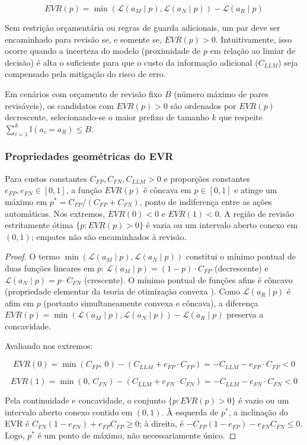 \begin{definition}
\[
EVR(p) = \min(\mathcal{L}(a_M\mid p), \mathcal{L}(a_N\mid p)) - \mathcal{L}(a_R\mid p)
\]
\end{definition}

Sem restrição orçamentária ou regras de guarda adicionais, um par deve ser encaminhado para revisão se, e somente se, $EVR(p) > 0$. Intuitivamente, isso ocorre quando a incerteza do modelo (proximidade de $p$ em relação ao limiar de decisão) é alta o suficiente para que o custo da informação adicional ($C_{LLM}$) seja compensado pela mitigação do risco de erro.

Em cenários com orçamento de revisão fixo $B$ (número máximo de pares revisáveis), os candidatos com $EVR(p)>0$ são ordenados por $EVR(p)$ decrescente, selecionando-se o maior prefixo de tamanho $k$ que respeite $\sum_{i=1}^k \mathbb{I}(a_i=a_R) \le B$.

\subsubsection{Propriedades geométricas do EVR}

\begin{proposition}[Concavidade]
\label{prop:evr-concavity}
Para custos constantes $C_{FP},C_{FN},C_{LLM}>0$ e proporções constantes $e_{FP},e_{FN}\in[0,1]$, a função $EVR(p)$ é côncava em $p\in[0,1]$ e atinge um máximo em $p^* = C_{FP}/(C_{FP} + C_{FN})$, ponto de indiferença entre as ações automáticas. Nos extremos, $EVR(0)<0$ e $EVR(1)<0$. A região de revisão estritamente ótima $\{p:EVR(p)>0\}$ é vazia ou um intervalo aberto conexo em $(0,1)$; empates não são encaminhados à revisão.
\end{proposition}

\begin{proof}
O termo $\min(\mathcal{L}(a_M\mid p), \mathcal{L}(a_N\mid p))$ constitui o mínimo pontual de duas funções lineares em $p$: $\mathcal{L}(a_M\mid p) = (1-p) \cdot C_{FP}$ (decrescente) e $\mathcal{L}(a_N\mid p) = p \cdot C_{FN}$ (crescente). O mínimo pontual de funções afins é côncavo (propriedade elementar da teoria de otimização convexa \cite{Boyd2004convex}). Como $\mathcal{L}(a_R\mid p)$ é afim em $p$ (portanto simultaneamente convexa e côncava), a diferença $EVR(p) = \min(\mathcal{L}(a_M\mid p), \mathcal{L}(a_N\mid p)) - \mathcal{L}(a_R\mid p)$ preserva a concavidade.

Avaliando nos extremos:

\[
EVR(0) = \min(C_{FP},\, 0) - (C_{LLM} + e_{FP} \cdot C_{FP}) = -C_{LLM} - e_{FP} \cdot C_{FP} < 0
\]

\[
EVR(1) = \min(0,\, C_{FN}) - (C_{LLM} + e_{FN} \cdot C_{FN}) = -C_{LLM} - e_{FN} \cdot C_{FN} < 0
\]

Pela continuidade e concavidade, o conjunto $\{p:EVR(p)>0\}$ é vazio ou um intervalo aberto conexo contido em $(0,1)$. À esquerda de $p^*$, a inclinação do EVR é $C_{FN}(1-e_{FN})+e_{FP}C_{FP}\ge0$; à direita, é $-C_{FP}(1-e_{FP})-e_{FN}C_{FN}\le0$. Logo, $p^*$ é um ponto de máximo, não necessariamente único.
\end{proof}

